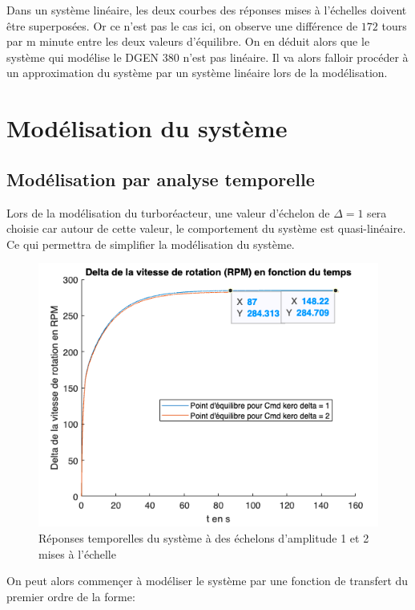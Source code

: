 \documentclass[12pt]{report}
\begin{document}
Dans un système linéaire, les deux courbes des réponses mises à l'échelles doivent 
être superposées. Or ce n'est pas le cas ici, on observe une différence de $172$ tours par m
minute entre les deux valeurs d'équilibre. On en déduit alors que le système qui 
modélise le DGEN 380 n'est pas linéaire. Il va alors falloir procéder à un 
approximation du système par un système linéaire lors de la modélisation.


\newpage


\section{Modélisation du système}

\subsection{Modélisation par analyse temporelle}

Lors de la modélisation du turboréacteur, une valeur d'échelon de $\Delta = 1$ 
sera choisie car autour de cette valeur, le comportement du système est quasi-linéaire.
Ce qui permettra de simplifier la modélisation du système.

\begin{figure}[!h]
  \vspace{1cm}
  \centering
  \includegraphics[scale=0.7]{fig/step_response_delta1-2_scaled.png}
  \caption{Réponses temporelles du système à des échelons d'amplitude 1 et 2 mises à l'échelle}
\end{figure}

On peut alors commençer à modéliser le système par une fonction de transfert 
du premier ordre de la forme:
\end{document}
